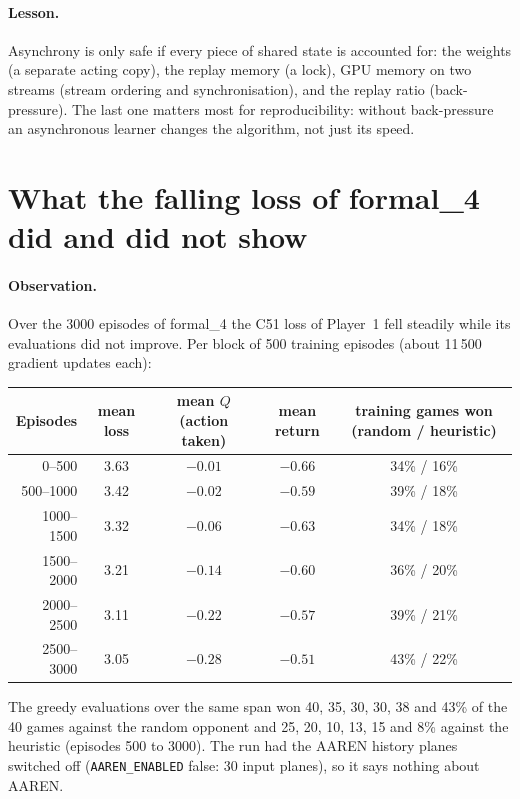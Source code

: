 \paragraph{Lesson.} Asynchrony is only safe if every piece of shared state is accounted for: the
weights (a separate acting copy), the replay memory (a lock), GPU memory on two streams (stream
ordering and synchronisation), and the replay ratio (back-pressure). The last one matters most
for reproducibility: without back-pressure an asynchronous learner changes the algorithm, not
just its speed.

\section{What the falling loss of formal\_4 did and did not show}

\paragraph{Observation.} Over the 3000 episodes of formal\_4 the C51 loss of Player~1 fell
steadily while its evaluations did not improve. Per block of 500 training episodes (about 11\,500
gradient updates each):
\begin{center}
\begin{tabular}{rcccc}
\toprule
Episodes & mean loss & mean $Q$ (action taken) & mean return & training games won (random / heuristic) \\
\midrule
0--500     & 3.63 & $-0.01$ & $-0.66$ & 34\% / 16\% \\
500--1000  & 3.42 & $-0.02$ & $-0.59$ & 39\% / 18\% \\
1000--1500 & 3.32 & $-0.06$ & $-0.63$ & 34\% / 18\% \\
1500--2000 & 3.21 & $-0.14$ & $-0.60$ & 36\% / 20\% \\
2000--2500 & 3.11 & $-0.22$ & $-0.57$ & 39\% / 21\% \\
2500--3000 & 3.05 & $-0.28$ & $-0.51$ & 43\% / 22\% \\
\bottomrule
\end{tabular}
\end{center}
The greedy evaluations over the same span won 40, 35, 30, 30, 38 and 43\% of the 40 games
against the random opponent and 25, 20, 10, 13, 15 and 8\% against the heuristic (episodes 500
to 3000). The run had the AAREN history planes switched off (\texttt{AAREN\_ENABLED} false: 30
input planes), so it says nothing about AAREN.

